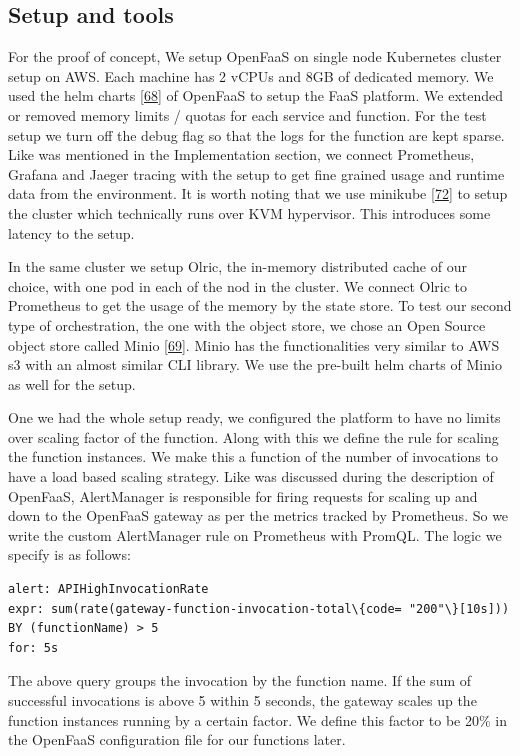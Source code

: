 \documentclass[12pt,titlepage]{article}
\begin{document}
\subsection{Setup and tools}
\label{sec:org7f4fd0b}
For the proof of concept, We setup OpenFaaS on single node Kubernetes cluster
setup on AWS. 
Each machine has 2 vCPUs and 8GB of dedicated memory. We used the
helm charts \hyperref[ref:68]{[68}] of OpenFaaS to setup the FaaS platform. We extended or
removed memory limits / quotas for each service and function.
For the test setup we turn off the debug flag so that the logs for the function
are kept sparse. Like was mentioned in the Implementation section, we connect
Prometheus, Grafana and Jaeger tracing with the setup to get fine grained usage
and runtime data from the environment. It is worth noting that we use minikube \hyperref[ref:71]{[72}]
to setup the cluster which technically runs over KVM hypervisor. This introduces
some latency to the setup.

In the same cluster we setup Olric, the in-memory distributed cache of our
choice, with one pod in each of the nod in the cluster. We connect Olric to
Prometheus to get the usage of the memory by the state store. To test our second
type of orchestration, the one with the object store, we chose an Open Source
object store called Minio \hyperref[ref:69]{[69}]. Minio has the functionalities very similar to
AWS s3 with an almost similar CLI library. We use the pre-built helm charts of
Minio as well for the setup.

One we had the whole setup ready, we configured the platform to have no limits
over scaling factor of the function. Along with this we define the rule for
scaling the function instances. We make this a function of the number of
invocations to have a load based scaling strategy. Like was discussed during the
description of OpenFaaS, AlertManager is responsible for firing requests for
scaling up and down to the OpenFaaS gateway as per the metrics tracked by
Prometheus. So we write the custom AlertManager rule on Prometheus with PromQL.
The logic we specify is as follows:
\begin{lstlisting}
alert: APIHighInvocationRate
expr: sum(rate(gateway-function-invocation-total\{code= "200"\}[10s])) BY (functionName) > 5
for: 5s
\end{lstlisting}
The above query groups the invocation by the function name. If the sum of
successful invocations is above 5 within 5 seconds, the gateway scales up the
function instances running by a certain factor. We define this factor to be 20\%
in the OpenFaaS configuration file for our functions later.
\end{document}
